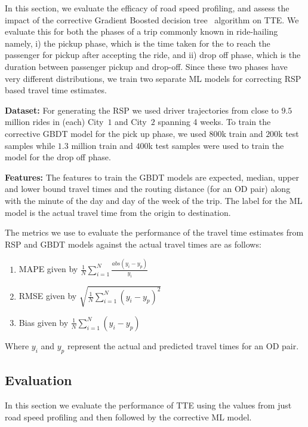 In this section, we evaluate the efficacy of road speed profiling, and assess the impact of the corrective Gradient Boosted decision tree~\cite{} algorithm on TTE. We evaluate this for both the phases of a trip commonly known in ride-hailing namely, i) the pickup phase, which is the time taken for the to reach the passenger for pickup after accepting the ride, and ii) drop off phase, which is the duration between passenger pickup and drop-off. Since these two phases have very different distributions, we train two separate ML models for correcting \ac{RSP} based travel time estimates. 

\textbf{Dataset:}
For generating the \ac{RSP} we used driver trajectories from close to $9.5$ million rides in (each)  City~$1$ and City~$2$ spanning 4 weeks. To train the corrective GBDT model for the pick up phase, we used $800$k train and $200$k test samples while  $1.3$ million train and $400$k test samples were used to train the model for the drop off phase.

\textbf{Features:}
The features to train the GBDT models are expected, median, upper and lower bound travel times and the routing distance (for an \ac{OD} pair) along with the minute of the day and day of the week of the trip. The label for the \ac{ML} model is the actual travel time from the origin to destination.

 

The metrics we use to evaluate the performance of the travel time estimates from \ac{RSP} and GBDT models against the actual travel times are as follows: 
\begin{enumerate}
\item \ac{MAPE} given by $\frac{1}{N}\sum_{i=1}^{N} \frac{abs(y_i-y_p)}{y_i}$

\item \ac{RMSE} given by $\sqrt{\frac{1}{N}\sum_{i=1}^{N} (y_i-y_p)^2}$

\item Bias given by $\frac{1}{N}\sum_{i=1}^{N} (y_i-y_p)$
\end{enumerate}
Where $y_i$ and $y_p$ represent the actual and predicted travel times for an \ac{OD} pair.

\subsection{Evaluation}
\label{subsec:results}
In this section we evaluate the performance of \ac{TTE} using the values from just road speed profiling and then followed by the corrective \ac{ML} model.

